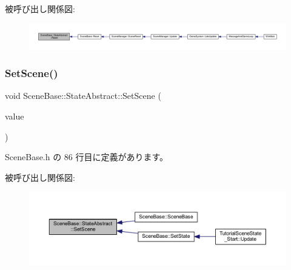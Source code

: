 被呼び出し関係図\+:\nopagebreak
\begin{figure}[H]
\begin{center}
\leavevmode
\includegraphics[width=350pt]{class_scene_base_1_1_state_abstract_a7e00d36fa023d91a0f205f12662584a0_icgraph}
\end{center}
\end{figure}
\mbox{\label{class_scene_base_1_1_state_abstract_a0d620f6a7f1bd8092cca2ccd7f70c299}} 
\subsubsection{\texorpdfstring{Set\+Scene()}{SetScene()}}
{\footnotesize\ttfamily void Scene\+Base\+::\+State\+Abstract\+::\+Set\+Scene (\begin{DoxyParamCaption}\item[{\mbox{\hyperlink{class_scene_base}{Scene\+Base}} $\ast$}]{value }\end{DoxyParamCaption})\hspace{0.3cm}{\ttfamily [inline]}}



 Scene\+Base.\+h の 86 行目に定義があります。

被呼び出し関係図\+:\nopagebreak
\begin{figure}[H]
\begin{center}
\leavevmode
\includegraphics[width=350pt]{class_scene_base_1_1_state_abstract_a0d620f6a7f1bd8092cca2ccd7f70c299_icgraph}
\end{center}
\end{figure}
\mbox{\label{class_scene_base_1_1_state_abstract_a7a92fbd3fd68177a4e807bf7c359641c}} 
